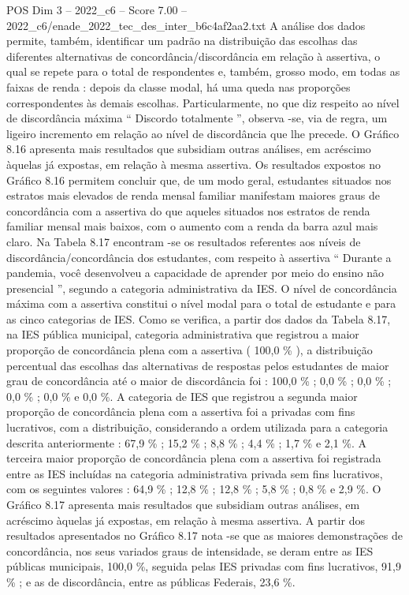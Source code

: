 \begin{textsample}{POS Dim 3 – 2022\_c6 – Score 7.00 – 2022\_c6/enade\_2022\_tec\_des\_inter\_b6c4af2aa2.txt}
A análise dos dados permite, também, identificar um padrão na distribuição das escolhas das diferentes alternativas de concordância/discordância em relação à assertiva, o qual se repete para o total de respondentes e, também, grosso modo, em todas as faixas de renda : depois da classe modal, há uma queda nas proporções correspondentes às demais escolhas.
Particularmente, no que diz respeito ao nível de discordância máxima “ Discordo totalmente ”, observa -se, via de regra, um ligeiro incremento em relação ao nível de discordância que lhe precede.
O Gráfico 8.16 apresenta mais resultados que subsidiam outras análises, em acréscimo àquelas já expostas, em relação à mesma assertiva.
Os resultados expostos no Gráfico 8.16 permitem concluir que, de um modo geral, estudantes situados nos estratos mais elevados de renda mensal familiar manifestam maiores graus de concordância com a assertiva do que aqueles situados nos estratos de renda familiar mensal mais baixos, com o aumento com a renda da barra azul mais claro.
Na Tabela 8.17 encontram -se os resultados referentes aos níveis de discordância/concordância dos estudantes, com respeito à assertiva “ Durante a pandemia, você desenvolveu a capacidade de aprender por meio do ensino não presencial ”, segundo a categoria administrativa da IES.
O nível de concordância máxima com a assertiva constitui o nível modal para o total de estudante e para as cinco categorias de IES.
Como se verifica, a partir dos dados da Tabela 8.17, na IES pública municipal, categoria administrativa que registrou a maior proporção de concordância plena com a assertiva ( 100,0 \% ), a distribuição percentual das escolhas das alternativas de respostas pelos estudantes de maior grau de concordância até o maior de discordância foi : 100,0 \% ; 0,0 \% ; 0,0 \% ; 0,0 \% ; 0,0 \% e 0,0 \%.
A categoria de IES que registrou a segunda maior proporção de concordância plena com a assertiva foi a privadas com fins lucrativos, com a distribuição, considerando a ordem utilizada para a categoria descrita anteriormente : 67,9 \% ; 15,2 \% ; 8,8 \% ; 4,4 \% ; 1,7 \% e 2,1 \%.
A terceira maior proporção de concordância plena com a assertiva foi registrada entre as IES incluídas na categoria administrativa privada sem fins lucrativos, com os seguintes valores : 64,9 \% ; 12,8 \% ; 12,8 \% ; 5,8 \% ; 0,8 \% e 2,9 \%.
O Gráfico 8.17 apresenta mais resultados que subsidiam outras análises, em acréscimo àquelas já expostas, em relação à mesma assertiva.
A partir dos resultados apresentados no Gráfico 8.17 nota -se que as maiores demonstrações de concordância, nos seus variados graus de intensidade, se deram entre as IES públicas municipais, 100,0 \%, seguida pelas IES privadas com fins lucrativos, 91,9 \% ; e as de discordância, entre as públicas Federais, 23,6 \%.

\end{textsample}

